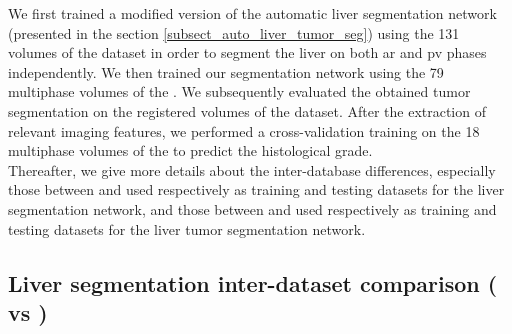 We first trained a modified version of the automatic liver segmentation network (presented in the section \ref{subsect_auto_liver_tumor_seg}) using the 131 volumes of the \textbf{} dataset in order to segment the liver on both \ac{ar} and \ac{pv} phases independently. We then trained our  segmentation network using the 79 multiphase volumes of the \textbf{}. We subsequently evaluated the obtained tumor segmentation on the registered volumes of the \textbf{} dataset. After the extraction of relevant imaging features, we performed a cross-validation training on the 18 multiphase volumes of the \textbf{} to predict the histological grade. \\
Thereafter, we give more details about the inter-database differences, especially those between \textbf{} and \textbf{} used respectively as training and testing datasets for the liver segmentation network, and those between \textbf{} and \textbf{} used respectively as training and testing datasets for the liver tumor segmentation network.

\subsection{Liver segmentation inter-dataset comparison (\textbf{} vs \textbf{})} \label{liver_interdb_comparison}

